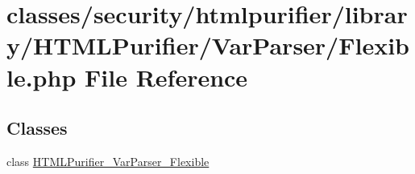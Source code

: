 \hypertarget{Flexible_8php}{\section{classes/security/htmlpurifier/library/\+H\+T\+M\+L\+Purifier/\+Var\+Parser/\+Flexible.php File Reference}
\label{Flexible_8php}
}
\subsection*{Classes}
\begin{DoxyCompactItemize}
\item 
class \hyperlink{classHTMLPurifier__VarParser__Flexible}{H\+T\+M\+L\+Purifier\+\_\+\+Var\+Parser\+\_\+\+Flexible}
\end{DoxyCompactItemize}
